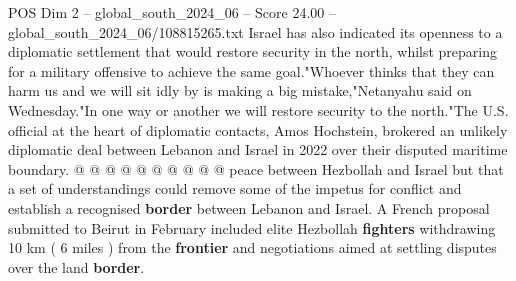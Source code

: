 \begin{textsample}{POS Dim 2 – global\_south\_2024\_06 – Score 24.00 – global\_south\_2024\_06/108815265.txt}
Israel has also indicated its openness to a diplomatic settlement that would restore security in the north, whilst preparing for a military offensive to achieve the same goal."Whoever thinks that they can harm us and we will sit idly by is making a big mistake,"Netanyahu said on Wednesday."In one way or another we will restore security to the north."The U.S. official at the heart of diplomatic contacts, Amos Hochstein, brokered an unlikely diplomatic deal between Lebanon and Israel in 2022 over their disputed maritime boundary. @ @ @ @ @ @ @ @ @ @ peace between Hezbollah and Israel but that a set of understandings could remove some of the impetus for conflict and establish a recognised \textbf{border} between Lebanon and Israel.
A French proposal submitted to Beirut in February included elite Hezbollah \textbf{fighters} withdrawing 10 km ( 6 miles ) from the \textbf{frontier} and negotiations aimed at settling disputes over the land \textbf{border}.

\end{textsample}
